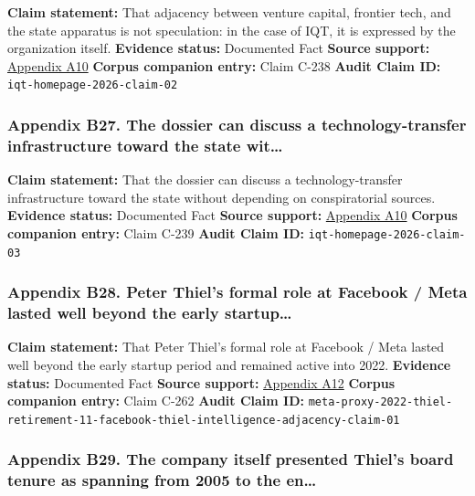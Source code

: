 \documentclass[
  american,
  11pt,
  letterpaper,
]{article}
\begin{document}
\textbf{Claim statement:} That adjacency between venture capital,
frontier tech, and the state apparatus is not speculation: in the case
of IQT, it is expressed by the organization itself. \textbf{Evidence
status:} Documented Fact \textbf{Source support:}
\hyperref[ch-07-appendix-a10-in-q-tel]{Appendix A10} \textbf{Corpus
companion entry:} Claim C-238 \textbf{Audit Claim ID:}
\texttt{iqt-homepage-2026-claim-02}

\subsubsection{Appendix B27. The dossier can discuss a
technology-transfer infrastructure toward the state
wit\ldots{}}\label{ch-07-appendix-b27-the-dossier-can-discuss-a-technology-transfer-infrastructure-toward-the-state-wit}

\textbf{Claim statement:} That the dossier can discuss a
technology-transfer infrastructure toward the state without depending on
conspiratorial sources. \textbf{Evidence status:} Documented Fact
\textbf{Source support:} \hyperref[ch-07-appendix-a10-in-q-tel]{Appendix
A10} \textbf{Corpus companion entry:} Claim C-239 \textbf{Audit Claim
ID:} \texttt{iqt-homepage-2026-claim-03}

\subsubsection{Appendix B28. Peter Thiel's formal role at Facebook /
Meta lasted well beyond the early
startup\ldots{}}\label{ch-07-appendix-b28-peter-thiel-s-formal-role-at-facebook-meta-lasted-well-beyond-the-early-startup}

\textbf{Claim statement:} That Peter Thiel's formal role at Facebook /
Meta lasted well beyond the early startup period and remained active
into 2022. \textbf{Evidence status:} Documented Fact \textbf{Source
support:}
\hyperref[ch-07-appendix-a12-meta-platforms-inc-2022-definitive-proxy-statement]{Appendix
A12} \textbf{Corpus companion entry:} Claim C-262 \textbf{Audit Claim
ID:}
\texttt{meta-proxy-2022-thiel-retirement-11-facebook-thiel-intelligence-adjacency-claim-01}

\subsubsection{Appendix B29. The company itself presented Thiel's board
tenure as spanning from 2005 to the
en\ldots{}}\label{ch-07-appendix-b29-the-company-itself-presented-thiel-s-board-tenure-as-spanning-from-2005-to-the-en}
\end{document}
